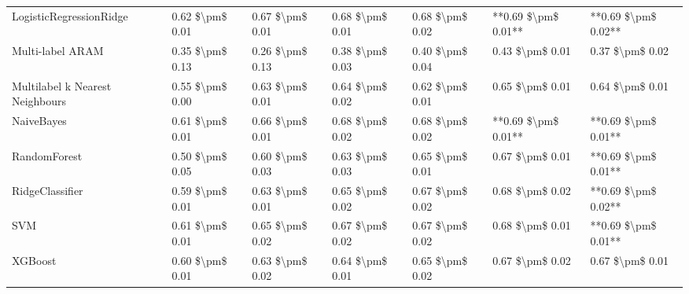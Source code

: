\begin{tabular}{lllllll}
        LogisticRegressionRidge & 0.62 \$\textbackslash pm\$ 0.01 &           0.67 \$\textbackslash pm\$ 0.01 &       0.68 \$\textbackslash pm\$ 0.01 &        0.68 \$\textbackslash pm\$ 0.02 &                     **0.69 \$\textbackslash pm\$ 0.01** & **0.69 \$\textbackslash pm\$ 0.02** \\
               Multi-label ARAM & 0.35 \$\textbackslash pm\$ 0.13 &           0.26 \$\textbackslash pm\$ 0.13 &       0.38 \$\textbackslash pm\$ 0.03 &        0.40 \$\textbackslash pm\$ 0.04 &                         0.43 \$\textbackslash pm\$ 0.01 &     0.37 \$\textbackslash pm\$ 0.02 \\
Multilabel k Nearest Neighbours & 0.55 \$\textbackslash pm\$ 0.00 &           0.63 \$\textbackslash pm\$ 0.01 &       0.64 \$\textbackslash pm\$ 0.02 &        0.62 \$\textbackslash pm\$ 0.01 &                         0.65 \$\textbackslash pm\$ 0.01 &     0.64 \$\textbackslash pm\$ 0.01 \\
                     NaiveBayes & 0.61 \$\textbackslash pm\$ 0.01 &           0.66 \$\textbackslash pm\$ 0.01 &       0.68 \$\textbackslash pm\$ 0.02 &        0.68 \$\textbackslash pm\$ 0.02 &                     **0.69 \$\textbackslash pm\$ 0.01** & **0.69 \$\textbackslash pm\$ 0.01** \\
                   RandomForest & 0.50 \$\textbackslash pm\$ 0.05 &           0.60 \$\textbackslash pm\$ 0.03 &       0.63 \$\textbackslash pm\$ 0.03 &        0.65 \$\textbackslash pm\$ 0.01 &                         0.67 \$\textbackslash pm\$ 0.01 & **0.69 \$\textbackslash pm\$ 0.01** \\
                RidgeClassifier & 0.59 \$\textbackslash pm\$ 0.01 &           0.63 \$\textbackslash pm\$ 0.01 &       0.65 \$\textbackslash pm\$ 0.02 &        0.67 \$\textbackslash pm\$ 0.02 &                         0.68 \$\textbackslash pm\$ 0.02 & **0.69 \$\textbackslash pm\$ 0.02** \\
                            SVM & 0.61 \$\textbackslash pm\$ 0.01 &           0.65 \$\textbackslash pm\$ 0.02 &       0.67 \$\textbackslash pm\$ 0.02 &        0.67 \$\textbackslash pm\$ 0.02 &                         0.68 \$\textbackslash pm\$ 0.01 & **0.69 \$\textbackslash pm\$ 0.01** \\
                        XGBoost & 0.60 \$\textbackslash pm\$ 0.01 &           0.63 \$\textbackslash pm\$ 0.02 &       0.64 \$\textbackslash pm\$ 0.01 &        0.65 \$\textbackslash pm\$ 0.02 &                         0.67 \$\textbackslash pm\$ 0.02 &     0.67 \$\textbackslash pm\$ 0.01 \\
\bottomrule
\end{tabular}
